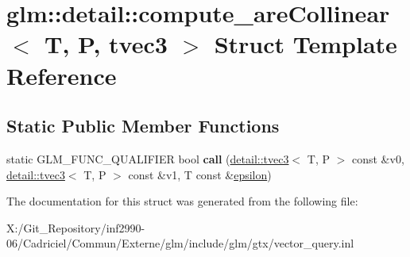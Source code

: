 \hypertarget{structglm_1_1detail_1_1compute__are_collinear_3_01_t_00_01_p_00_01tvec3_01_4}{\section{glm\-:\-:detail\-:\-:compute\-\_\-are\-Collinear$<$ T, P, tvec3 $>$ Struct Template Reference}
\label{structglm_1_1detail_1_1compute__are_collinear_3_01_t_00_01_p_00_01tvec3_01_4}
}
\subsection*{Static Public Member Functions}
\begin{DoxyCompactItemize}
\item 
\hypertarget{structglm_1_1detail_1_1compute__are_collinear_3_01_t_00_01_p_00_01tvec3_01_4_a1b9e023b1518128243ec6cc5748faccc}{static G\-L\-M\-\_\-\-F\-U\-N\-C\-\_\-\-Q\-U\-A\-L\-I\-F\-I\-E\-R bool {\bfseries call} (\hyperlink{structglm_1_1detail_1_1tvec3}{detail\-::tvec3}$<$ T, P $>$ const \&v0, \hyperlink{structglm_1_1detail_1_1tvec3}{detail\-::tvec3}$<$ T, P $>$ const \&v1, T const \&\hyperlink{group__gtc__constants_gacb41049b8d22c8aa90e362b96c524feb}{epsilon})}\label{structglm_1_1detail_1_1compute__are_collinear_3_01_t_00_01_p_00_01tvec3_01_4_a1b9e023b1518128243ec6cc5748faccc}

\end{DoxyCompactItemize}


The documentation for this struct was generated from the following file\-:\begin{DoxyCompactItemize}
\item 
X\-:/\-Git\-\_\-\-Repository/inf2990-\/06/\-Cadriciel/\-Commun/\-Externe/glm/include/glm/gtx/vector\-\_\-query.\-inl\end{DoxyCompactItemize}
